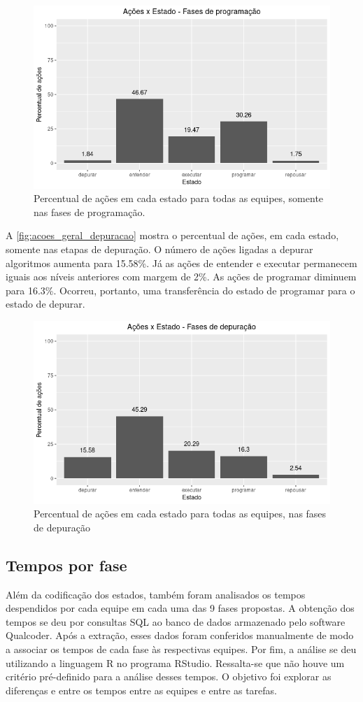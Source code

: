 \begin{figure}[!htpb]
    \centering
    \includegraphics[width=.6\linewidth,fbox]{figs/graficos/acoes_geral_programacao.png}
    \caption{Percentual de ações em cada estado para todas as equipes, somente nas fases de programação.}
    \sourceauthor
    \label{fig:acoes_geral_programacao}
\end{figure}

A \autoref{fig:acoes_geral_depuracao} mostra o percentual de ações, em cada estado, somente nas etapas de depuração. O número de ações ligadas a depurar algoritmos aumenta para 15.58\%. Já as ações de entender e executar permanecem iguais aos níveis anteriores com margem de 2\%. As ações de programar diminuem para 16.3\%. Ocorreu, portanto, uma transferência do estado de programar para o estado de depurar. 

\begin{figure}[!htpb]
    \centering
    \includegraphics[width=.6\linewidth,fbox]{figs/graficos/acoes_geral_depuracao.png}
    \caption{Percentual de ações em cada estado para todas as equipes, nas fases de depuração}
    \sourceauthor
    \label{fig:acoes_geral_depuracao}
\end{figure}

 \subsection{Tempos por fase}

Além da codificação dos estados, também foram analisados os tempos despendidos por cada equipe em cada uma das 9 fases propostas. A obtenção dos tempos se deu por consultas SQL ao banco de dados armazenado pelo software Qualcoder. Após a extração, esses dados foram conferidos manualmente de modo a associar os tempos de cada fase às respectivas equipes. Por fim, a análise se deu utilizando a linguagem R no programa RStudio. Ressalta-se que não houve um critério pré-definido para a análise desses tempos. O objetivo foi explorar as diferenças e entre os tempos entre as equipes e entre as tarefas. 


